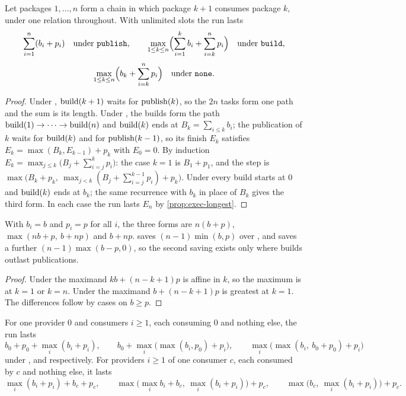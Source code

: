 \begin{proposition}
\label{prop:exec-chain}
Let packages $1, \dots, n$ form a chain in which package $k+1$ consumes package
$k$, under one relation throughout. With unlimited slots the run lasts
\[
  \sum_{i=1}^{n} (b_i + p_i) \quad\text{under \texttt{publish}},\qquad
  \max_{1 \le k \le n}\Bigl(\sum_{i=1}^{k} b_i + \sum_{i=k}^{n} p_i\Bigr)
  \quad\text{under \texttt{build}},
\]
\[
  \max_{1 \le k \le n}\Bigl(b_k + \sum_{i=k}^{n} p_i\Bigr)
  \quad\text{under \texttt{none}}.
\]
\end{proposition}

\begin{proof}
Under , $\mathrm{build}(k+1)$ waits for $\mathrm{publish}(k)$, so the $2n$ tasks
form one path and the sum is its length. Under , the builds form
the path $\mathrm{build}(1) \to \dots \to \mathrm{build}(n)$ and $\mathrm{build}(k)$ ends at
$B_k = \sum_{i \le k} b_i$; the publication of $k$ waits for $\mathrm{build}(k)$ and
for $\mathrm{publish}(k-1)$, so its finish $E_k$ satisfies $E_k = \max(B_k, E_{k-1}) +
p_k$ with $E_0 = 0$. By induction $E_k = \max_{j \le k}\bigl(B_j +
\sum_{i=j}^{k} p_i\bigr)$: the case $k = 1$ is $B_1 + p_1$, and the step is
$\max\bigl(B_k + p_k,\ \max_{j < k}(B_j + \sum_{i=j}^{k-1} p_i) + p_k\bigr)$.
Under  every build starts at $0$ and $\mathrm{build}(k)$ ends at $b_k$;
the same recurrence with $b_k$ in place of $B_k$ gives the third form. In each
case the run lasts $E_n$ by \cref{prop:exec-longest}.
\end{proof}

\begin{corollary}
\label{cor:exec-equal}
With $b_i = b$ and $p_i = p$ for all $i$, the three forms are $n(b+p)$,
$\max(nb + p,\ b + np)$ and $b + np$.  saves $(n-1)\min(b,p)$
over , and  saves a further $(n-1)\max(b-p, 0)$, so
the second saving exists only where builds outlast publications.
\end{corollary}

\begin{proof}
Under  the maximand $kb + (n-k+1)p$ is affine in $k$, so the
maximum is at $k = 1$ or $k = n$. Under  the maximand $b + (n-k+1)p$
is greatest at $k = 1$. The differences follow by cases on $b \ge p$.
\end{proof}

\begin{proposition}
\label{prop:exec-fan}
For one provider $0$ and consumers $i \ge 1$, each consuming $0$ and nothing
else, the run lasts
\[
  b_0 + p_0 + \max_i (b_i + p_i),\qquad
  b_0 + \max_i\bigl(\max(b_i, p_0) + p_i\bigr),\qquad
  \max_i\bigl(\max(b_i,\ b_0 + p_0) + p_i\bigr)
\]
under ,  and  respectively. For providers
$i \ge 1$ of one consumer $c$, each consumed by $c$ and nothing else, it lasts
\[
  \max_i (b_i + p_i) + b_c + p_c,\qquad
  \max\bigl(\max_i b_i + b_c,\ \max_i (b_i + p_i)\bigr) + p_c,\qquad
  \max\bigl(b_c,\ \max_i (b_i + p_i)\bigr) + p_c.
\]
\end{proposition}

